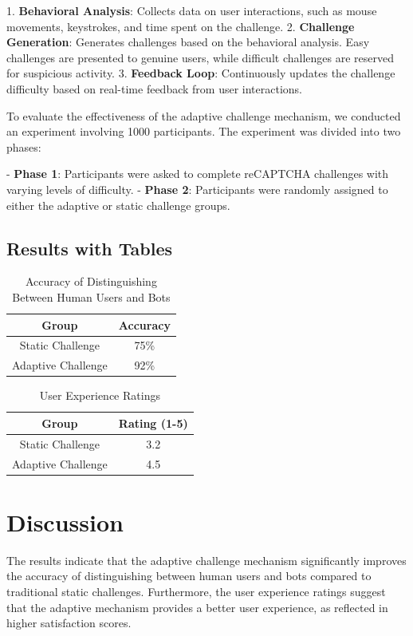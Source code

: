 \documentclass{article}
\begin{document}
1. \textbf{Behavioral Analysis}: Collects data on user interactions, such as mouse movements, keystrokes, and time spent on the challenge.
2. \textbf{Challenge Generation}: Generates challenges based on the behavioral analysis. Easy challenges are presented to genuine users, while difficult challenges are reserved for suspicious activity.
3. \textbf{Feedback Loop}: Continuously updates the challenge difficulty based on real-time feedback from user interactions.

To evaluate the effectiveness of the adaptive challenge mechanism, we conducted an experiment involving 1000 participants. The experiment was divided into two phases:

- \textbf{Phase 1}: Participants were asked to complete reCAPTCHA challenges with varying levels of difficulty.
- \textbf{Phase 2}: Participants were randomly assigned to either the adaptive or static challenge groups.

\subsection{Results with Tables}
\begin{table}[htbp]
\centering
\begin{tabularx}{\textwidth}{|c|c|}
\hline
Group & Accuracy \\
\hline
Static Challenge & 75\% \\
Adaptive Challenge & 92\% \\
\hline
\end{tabularx}
\caption{Accuracy of Distinguishing Between Human Users and Bots}
\label{tab:accuracy}
\end{table}

\begin{table}[htbp]
\centering
\begin{tabularx}{\textwidth}{|c|c|}
\hline
Group & Rating (1-5) \\
\hline
Static Challenge & 3.2 \\
Adaptive Challenge & 4.5 \\
\hline
\end{tabularx}
\caption{User Experience Ratings}
\label{tab:user_experience}
\end{table}

\section{Discussion}
The results indicate that the adaptive challenge mechanism significantly improves the accuracy of distinguishing between human users and bots compared to traditional static challenges. Furthermore, the user experience ratings suggest that the adaptive mechanism provides a better user experience, as reflected in higher satisfaction scores.
\end{document}
